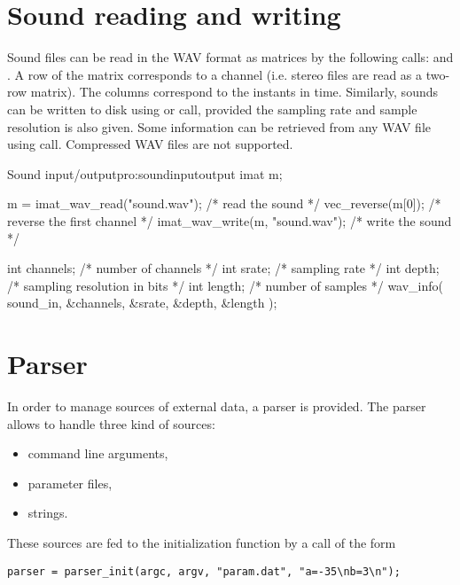 \section{Sound reading and writing}
\label{sound:imreadwrite}


  Sound files can be read in the WAV format as matrices by the following calls:
       and . A
      row of the matrix corresponds to a channel (i.e. stereo files
      are read as a two-row matrix). The columns correspond to the
      instants in time. Similarly, sounds can be written to disk using
       or
       call,
      provided the sampling rate and sample resolution is also
      given. Some information can be retrieved from any WAV file using
       call. Compressed
      WAV files are not supported. 

\begin{program}{Sound input/output}{pro:soundinputoutput}
  imat m;

  m = imat_wav_read("sound.wav"); /* read the sound            */
  vec_reverse(m[0]);              /* reverse the first channel */
  imat_wav_write(m, "sound.wav"); /* write the sound           */

  int channels;        /* number of channels          */
  int srate;           /* sampling rate               */
  int depth;           /* sampling resolution in bits */
  int length;          /* number of samples           */
  wav_info( sound_in, &channels, &srate, &depth, &length );
\end{program}


\section{Parser}

  In order to manage sources of external data, a parser is provided. 
The parser allows to handle three kind of sources: 
\begin{itemize}
\item command line arguments, 
\item parameter files, 
\item strings.
\end{itemize}

These sources are fed to the initialization function
 by a call of the form

{\small
\begin{verbatim}
parser = parser_init(argc, argv, "param.dat", "a=-35\nb=3\n");
\end{verbatim}
}

